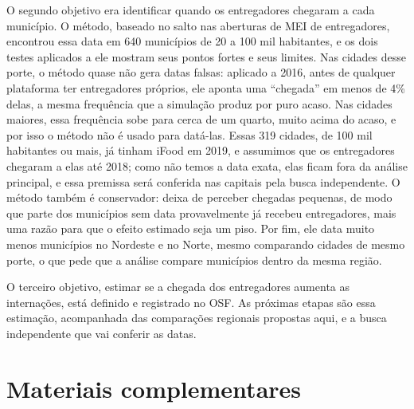 \documentclass[
  11pt,
]{article}
\begin{document}
O segundo objetivo era identificar quando os entregadores chegaram a cada município. O método, baseado no salto nas aberturas de MEI de entregadores, encontrou essa data em 640 municípios de 20 a 100 mil habitantes, e os dois testes aplicados a ele mostram seus pontos fortes e seus limites. Nas cidades desse porte, o método quase não gera datas falsas: aplicado a 2016, antes de qualquer plataforma ter entregadores próprios, ele aponta uma ``chegada'' em menos de 4\% delas, a mesma frequência que a simulação produz por puro acaso. Nas cidades maiores, essa frequência sobe para cerca de um quarto, muito acima do acaso, e por isso o método não é usado para datá-las. Essas 319 cidades, de 100 mil habitantes ou mais, já tinham iFood em 2019, e assumimos que os entregadores chegaram a elas até 2018; como não temos a data exata, elas ficam fora da análise principal, e essa premissa será conferida nas capitais pela busca independente. O método também é conservador: deixa de perceber chegadas pequenas, de modo que parte dos municípios sem data provavelmente já recebeu entregadores, mais uma razão para que o efeito estimado seja um piso. Por fim, ele data muito menos municípios no Nordeste e no Norte, mesmo comparando cidades de mesmo porte, o que pede que a análise compare municípios dentro da mesma região.

O terceiro objetivo, estimar se a chegada dos entregadores aumenta as internações, está definido e registrado no OSF. As próximas etapas são essa estimação, acompanhada das comparações regionais propostas aqui, e a busca independente que vai conferir as datas.

\hypertarget{materiais-complementares}{%
\section{Materiais complementares}\label{materiais-complementares}}
\end{document}

